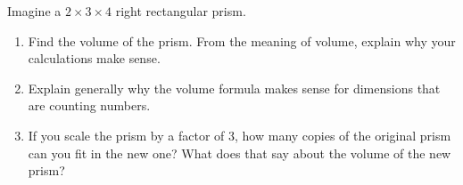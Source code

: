 \begin{prob}
Imagine a $2\times 3\times 4$ right rectangular prism.  
\begin{enumerate}
\item Find the volume of the prism.  From the meaning of volume, explain why your calculations make sense.  
\item Explain generally why the volume formula makes sense for dimensions that are counting numbers.  
\item If you scale the prism by a factor of 3, how many copies of the original prism can you fit in the new one?  What does that say about the volume of the new prism?   
\end{enumerate}
\end{prob}

